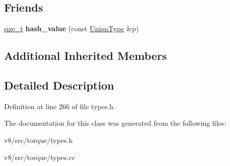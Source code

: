 \subsection*{Friends}
\begin{DoxyCompactItemize}
\item 
\mbox{\label{classv8_1_1internal_1_1torque_1_1UnionType_a94251e5e6781830d2423494663f57412}} 
\mbox{\hyperlink{classsize__t}{size\+\_\+t}} {\bfseries hash\+\_\+value} (const \mbox{\hyperlink{classv8_1_1internal_1_1torque_1_1UnionType}{Union\+Type}} \&p)
\end{DoxyCompactItemize}
\subsection*{Additional Inherited Members}


\subsection{Detailed Description}


Definition at line 266 of file types.\+h.



The documentation for this class was generated from the following files\+:\begin{DoxyCompactItemize}
\item 
v8/src/torque/types.\+h\item 
v8/src/torque/types.\+cc\end{DoxyCompactItemize}
